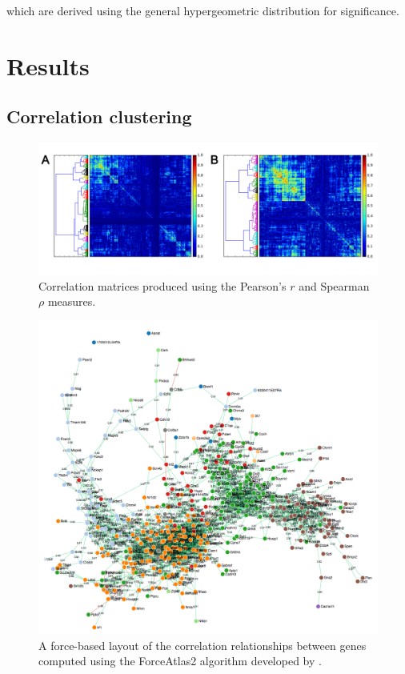 \documentclass[12pt,oneside,onecolumn,a4paper]{article}
\begin{document}
\noindent
which are derived using the general hypergeometric distribution for significance.

\section{Results}

\subsection{Correlation clustering}

\begin{figure}[H]
\begin{center}
\includegraphics[width=\columnwidth]{figures/pearson_spearman}
\caption{Correlation matrices produced using the Pearson's $r$ and Spearman $\rho$ measures. \label{fig:correlations}%
}
\end{center}
\end{figure}

\begin{figure}[H]
\begin{center}
\includegraphics[width=\columnwidth]{figures/graph}
\caption{A force-based layout of the correlation relationships between genes computed using the ForceAtlas2 algorithm developed by \cite{Jacomy2014ForceAtlas2AC}. \label{fig:network}%
}
\end{center}
\end{figure}
\end{document}
